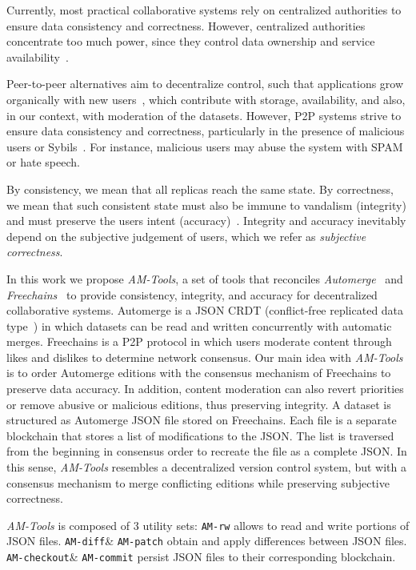 \documentclass[12pt]{article}
\newcommand{\AMT}      {\emph{AM-Tools}\xspace}
\newcommand{\code}[1]  {\texttt{\footnotesize{#1}}}
\newcommand{\amrw}       {\code{AM-rw}\xspace}
\newcommand{\amdiff}     {\code{AM-diff}\xspace}
\newcommand{\ampatch}    {\code{AM-patch}\xspace}
\newcommand{\amcheckout} {\code{AM-checkout}\xspace}
\newcommand{\amcommit}   {\code{AM-commit}\xspace}
\begin{document}
Currently, most practical collaborative systems rely on centralized authorities
to ensure data consistency and correctness.
However, centralized authorities concentrate too much power, since they control
data ownership and service availability~\cite{pincheira2022decentralized}.

Peer-to-peer alternatives aim to decentralize control, such that applications
grow organically with new users~\cite{rodrigues2010peer}, which contribute with
storage, availability, and also, in our context, with moderation of the
datasets.
%
However, P2P systems strive to ensure data consistency and correctness,
particularly in the presence of malicious users or
Sybils~\cite{douceur2002sybil}.
For instance, malicious users may abuse the system with SPAM or hate speech.

By consistency, we mean that all replicas reach the same state.
By correctness, we mean that such consistent state must also be immune to
vandalism (integrity) and must preserve the users intent
(accuracy)~\cite{litt2022peritext}.
Integrity and accuracy inevitably depend on the subjective judgement of users,
which we refer as \emph{subjective correctness}.

In this work we propose \AMT, a set of tools that reconciles
\emph{Automerge}~\cite{p2p.automerge} and \emph{Freechains}~\cite{fcs.sbseg20}
to provide consistency, integrity, and accuracy for decentralized collaborative
systems.
%
Automerge is a JSON CRDT (conflict-free replicated data type~\cite{p2p.crdts})
in which datasets can be read and written concurrently with automatic merges.
%
Freechains is a P2P protocol in which users moderate content through likes and
dislikes to determine network consensus.
%
Our main idea with \AMT is to order Automerge editions with the consensus
mechanism of Freechains to preserve data accuracy.
In addition, content moderation can also revert priorities or remove abusive or
malicious editions, thus preserving integrity.
%
A dataset is structured as Automerge JSON file stored on Freechains.
Each file is a separate blockchain that stores a list of modifications to the
JSON.
The list is traversed from the beginning in consensus order to recreate the
file as a complete JSON.
%
In this sense, \AMT resembles a decentralized version control system, but with
a consensus mechanism to merge conflicting editions while preserving subjective
correctness.

\AMT is composed of 3 utility sets:
\amrw allows to read and write portions of JSON files.
\amdiff \& \ampatch obtain and apply differences between JSON files.
\amcheckout \& \amcommit persist JSON files to their corresponding blockchain.
\end{document}
